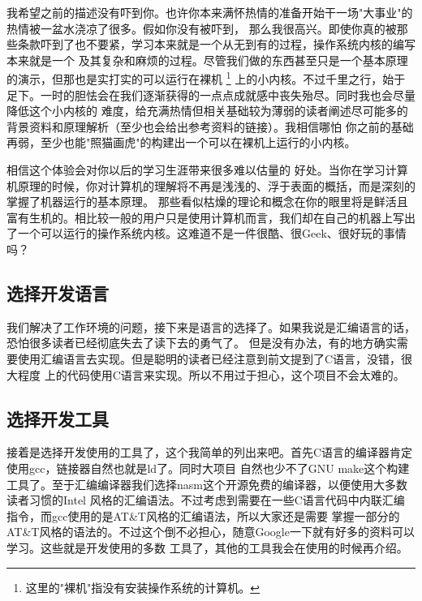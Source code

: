 \par 我希望之前的描述没有吓到你。也许你本来满怀热情的准备开始干一场"大事业"的热情被一盆水浇凉了很多。假如你没有被吓到，\allowbreak
那么我很高兴。即使你真的被那些条款吓到了也不要紧，学习本来就是一个从无到有的过程，操作系统内核的编写本来就是一个\allowbreak
及其复杂和麻烦的过程。尽管我们做的东西甚至只是一个基本原理的演示，但那也是实打实的可以运行在裸机\allowbreak
\footnote{这里的"裸机"指没有安装操作系统的计算机。}
上的小内核。不过千里之行，始于足下。一时的胆怯会在我们逐渐获得的一点点成就感中丧失殆尽。同时我也会尽量降低这个小内核的\allowbreak
难度，给充满热情但相关基础较为薄弱的读者阐述尽可能多的背景资料和原理解析（至少也会给出参考资料的链接）。我相信哪怕\allowbreak
你之前的基础再弱，至少也能"照猫画虎"的构建出一个可以在裸机上运行的小内核。

\par 相信这个体验会对你以后的学习生涯带来很多难以估量的\allowbreak
好处。当你在学习计算机原理的时候，你对计算机的理解将不再是浅浅的、浮于表面的概括，而是深刻的掌握了机器运行的基本原理。\allowbreak
那些看似枯燥的理论和概念在你的眼里将是鲜活且富有生机的。相比较一般的用户只是使用计算机而言，我们却在自己的机器上写出\allowbreak
了一个可以运行的操作系统内核。这难道不是一件很酷、很Geek、很好玩的事情吗？

\subsection{选择开发语言}
\par 我们解决了工作环境的问题，接下来是语言的选择了。如果我说是汇编语言的话，恐怕很多读者已经彻底失去了读下去的勇气了。\allowbreak
但是没有办法，有的地方确实需要使用汇编语言去实现。但是聪明的读者已经注意到前文提到了C语言，没错，很大程度\allowbreak
上的代码使用C语言来实现。所以不用过于担心，这个项目不会太难的。

\subsection{选择开发工具}
\par 接着是选择开发使用的工具了，这个我简单的列出来吧。首先C语言的编译器肯定使用gcc，链接器自然也就是ld了。同时大项目\allowbreak
自然也少不了GNU make这个构建工具了。至于汇编编译器我们选择nasm这个开源免费的编译器，以便使用大多数读者习惯的Intel\allowbreak
风格的汇编语法。不过考虑到需要在一些C语言代码中内联汇编指令，而gcc使用的是AT\&T风格的汇编语法，所以大家还是需要\allowbreak
掌握一部分的AT\&T风格的语法的。不过这个倒不必担心，随意Google一下就有好多的资料可以学习。这些就是开发使用的多数\allowbreak
工具了，其他的工具我会在使用的时候再介绍。


